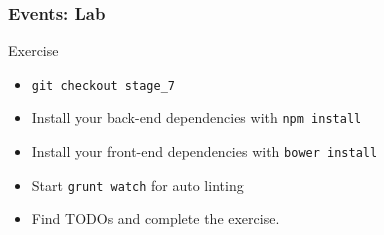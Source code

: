 \begin{frame}[fragile]
  \frametitle{Events: Lab}
  \begin{block}{Exercise}
    \begin{itemize}
      \item \texttt{git checkout stage\_7}
      \item Install your back-end dependencies with \texttt{npm install}
      \item Install your front-end dependencies with \texttt{bower install}
      \item Start \texttt{grunt watch} for auto linting
      \item Find TODOs and complete the exercise.
    \end{itemize}
  \end{block}
\end{frame}
